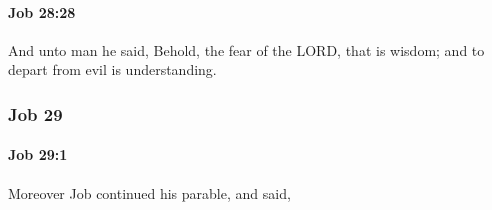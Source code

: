 		\paragraph{Job 28:28} %
			\label{JOB-28-28}

			And unto man he said, Behold, the fear of the LORD, that is wisdom; and to depart from evil is understanding.

	\subsubsection{Job 29} %
		\label{JOB-29}

		\paragraph{Job 29:1} %
			\label{JOB-29-1}

			Moreover Job continued his parable, and said,


